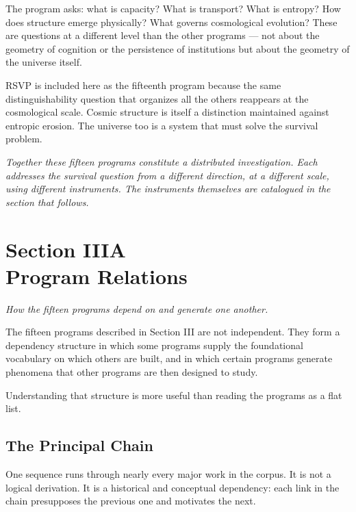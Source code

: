 \documentclass[12pt, openany]{book}
\begin{document}
The program asks: what is capacity? What is transport? What is entropy? How
does structure emerge physically? What governs cosmological evolution? These
are questions at a different level than the other programs — not about the
geometry of cognition or the persistence of institutions but about the
geometry of the universe itself.

RSVP is included here as the fifteenth program because the same
distinguishability question that organizes all the others reappears at the
cosmological scale. Cosmic structure is itself a distinction maintained
against entropic erosion. The universe too is a system that must solve the
survival problem.

\bigskip\bigskip

\noindent\textit{Together these fifteen programs constitute a distributed
investigation. Each addresses the survival question from a different
direction, at a different scale, using different instruments. The
instruments themselves are catalogued in the section that follows.}

\cleardoublepage

\chapter[Program Relations]{Section IIIA \\ Program Relations}

\noindent\textit{How the fifteen programs depend on and generate one another.}

\bigskip

\noindent The fifteen programs described in Section III are not independent.
They form a dependency structure in which some programs supply the
foundational vocabulary on which others are built, and in which certain
programs generate phenomena that other programs are then designed to study.

Understanding that structure is more useful than reading the programs as a
flat list.

\section{The Principal Chain}

One sequence runs through nearly every major work in the corpus. It is not
a logical derivation. It is a historical and conceptual dependency: each
link in the chain presupposes the previous one and motivates the next.
\end{document}
